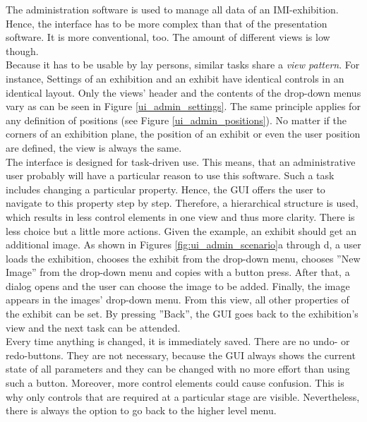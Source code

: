
The administration software is used to manage all data of an \ac{IMI}-exhibition. Hence, the interface has to be more complex than that of the presentation software. It is more conventional, too. The amount of different views is low though. 
\\
Because it has to be usable by lay persons, similar tasks share a \textit{view pattern}. For instance, Settings of an exhibition and an exhibit have identical controls in an identical layout. Only the views' header and the contents of the drop-down menus vary as can be seen in Figure \ref{ui_admin_settings}. The same principle applies for any definition of positions (see Figure \ref{ui_admin_positions}). No matter if the corners of an exhibition plane, the position of an exhibit or even the user position are defined, the view is always the same.
\\
The interface is designed for task-driven use. This means, that an administrative user probably will have a particular reason to use this software. Such a task includes changing a particular property. Hence, the \ac{GUI} offers the user to navigate to this property step by step. Therefore, a hierarchical structure is used, which results in less control elements in one view and thus more clarity. There is less choice but a little more actions. Given the example, an exhibit should get an additional image. As shown in Figures \ref{fig:ui_admin_scenario}a through d, a user loads the exhibition, chooses the exhibit from the drop-down menu, chooses ''New Image'' from the drop-down menu and copies with a button press. After that, a dialog opens and the user can choose the image to be added. Finally, the image appears in the images' drop-down menu. From this view, all other properties of the exhibit can be set. By pressing ''Back'', the \ac{GUI} goes back to the exhibition's view and the next task can be attended.
\\
Every time anything is changed, it is immediately saved. There are no undo- or redo-buttons. They are not necessary, because the \ac{GUI} always shows the current state of all parameters and they can be changed with no more effort than using such a button. Moreover, more control elements could cause confusion. This is why only controls that are required at a particular stage are visible. Nevertheless, there is always the option to go back to the higher level menu.

